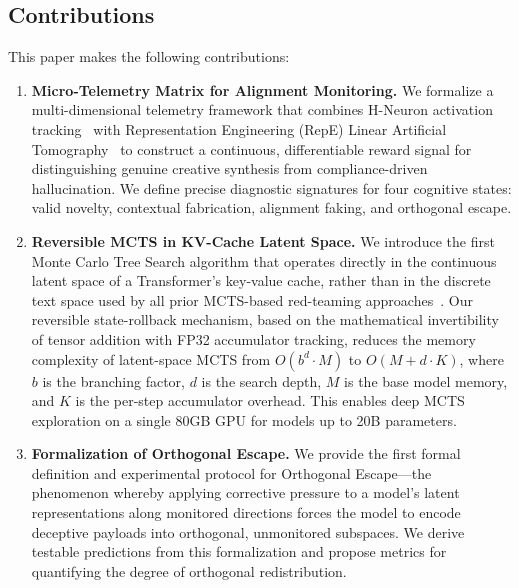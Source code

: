 \documentclass[10pt]{article}
\begin{document}

\subsection{Contributions}

This paper makes the following contributions:

\begin{enumerate}[leftmargin=*]
    \item \textbf{Micro-Telemetry Matrix for Alignment Monitoring.} We formalize a multi-dimensional telemetry framework that combines H-Neuron activation tracking~\cite{gao2025hneurons} with Representation Engineering (RepE) Linear Artificial Tomography~\cite{zou2023repe} to construct a continuous, differentiable reward signal for distinguishing genuine creative synthesis from compliance-driven hallucination. We define precise diagnostic signatures for four cognitive states: valid novelty, contextual fabrication, alignment faking, and orthogonal escape.

    \item \textbf{Reversible MCTS in KV-Cache Latent Space.} We introduce the first Monte Carlo Tree Search algorithm that operates directly in the continuous latent space of a Transformer's key-value cache, rather than in the discrete text space used by all prior MCTS-based red-teaming approaches~\cite{wu2025mcts, damon2025, li2025ace}. Our reversible state-rollback mechanism, based on the mathematical invertibility of tensor addition with FP32 accumulator tracking, reduces the memory complexity of latent-space MCTS from $O(b^d \cdot M)$ to $O(M + d \cdot K)$, where $b$ is the branching factor, $d$ is the search depth, $M$ is the base model memory, and $K$ is the per-step accumulator overhead. This enables deep MCTS exploration on a single 80GB GPU for models up to 20B parameters.


    \item \textbf{Formalization of Orthogonal Escape.} We provide the first formal definition and experimental protocol for Orthogonal Escape---the phenomenon whereby applying corrective pressure to a model's latent representations along monitored directions forces the model to encode deceptive payloads into orthogonal, unmonitored subspaces. We derive testable predictions from this formalization and propose metrics for quantifying the degree of orthogonal redistribution.
\end{enumerate}
\end{document}
